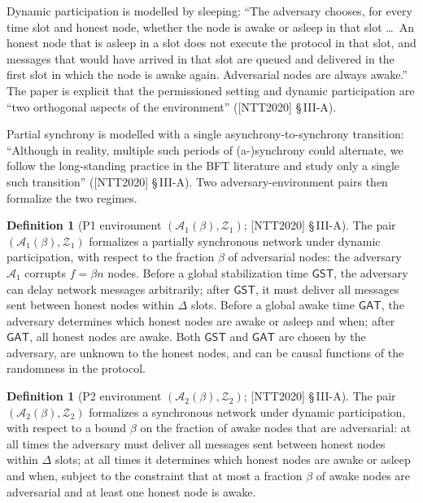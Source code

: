 \documentclass[11pt,a4paper]{article}
\theoremstyle{definition}
\newtheorem{definition}[theorem]{Definition}
\begin{document}
Dynamic participation is modelled by sleeping: ``The adversary chooses,
for every time slot and honest node, whether the node is awake or asleep
in that slot \dots\ An honest node that is asleep in a slot does not
execute the protocol in that slot, and messages that would have arrived in
that slot are queued and delivered in the first slot in which the node is
awake again. Adversarial nodes are always awake.'' The paper is explicit
that the permissioned setting and dynamic participation are ``two
orthogonal aspects of the environment'' ([NTT2020] \S\,III-A).

Partial synchrony is modelled with a single asynchrony-to-synchrony
transition: ``Although in reality, multiple such periods of (a-)synchrony
could alternate, we follow the long-standing practice in the BFT
literature and study only a single such transition'' ([NTT2020]
\S\,III-A). Two adversary-environment pairs then formalize the two
regimes.

\begin{definition}[P1 environment $(\mathcal{A}_1(\beta), \mathcal{Z}_1)$;
{[NTT2020]} \S\,III-A]\label{def:xl-env-p1}
The pair $(\mathcal{A}_1(\beta), \mathcal{Z}_1)$ formalizes a partially
synchronous network under dynamic participation, with respect to the
fraction $\beta$ of adversarial nodes: the adversary $\mathcal{A}_1$
corrupts $f = \beta n$ nodes. Before a global stabilization time
$\mathsf{GST}$, the adversary can delay network messages arbitrarily;
after $\mathsf{GST}$, it must deliver all messages sent between honest
nodes within $\Delta$ slots. Before a global awake time $\mathsf{GAT}$,
the adversary determines which honest nodes are awake or asleep and when;
after $\mathsf{GAT}$, all honest nodes are awake. Both $\mathsf{GST}$ and
$\mathsf{GAT}$ are chosen by the adversary, are unknown to the honest
nodes, and can be causal functions of the randomness in the protocol.
\end{definition}

\begin{definition}[P2 environment $(\mathcal{A}_2(\beta), \mathcal{Z}_2)$;
{[NTT2020]} \S\,III-A]\label{def:xl-env-p2}
The pair $(\mathcal{A}_2(\beta), \mathcal{Z}_2)$ formalizes a synchronous
network under dynamic participation, with respect to a bound $\beta$ on
the fraction of awake nodes that are adversarial: at all times the
adversary must deliver all messages sent between honest nodes within
$\Delta$ slots; at all times it determines which honest nodes are awake or
asleep and when, subject to the constraint that at most a fraction $\beta$
of awake nodes are adversarial and at least one honest node is awake.
\end{definition}
\end{document}

